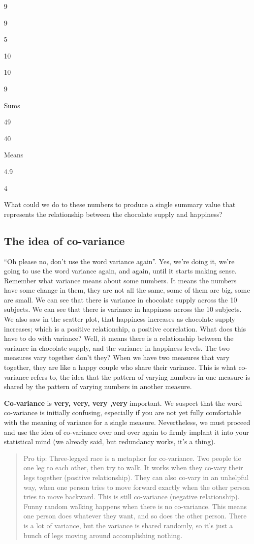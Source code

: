 \documentclass[
]{book}
\begin{document}
9

9

5

10

10

9

Sums

49

40

Means

4.9

4

What could we do to these numbers to produce a single summary value that represents the relationship between the chocolate supply and happiness?

\hypertarget{the-idea-of-co-variance}{%
\subsection{The idea of co-variance}\label{the-idea-of-co-variance}}

``Oh please no, don't use the word variance again''. Yes, we're doing it, we're going to use the word variance again, and again, until it starts making sense. Remember what variance means about some numbers. It means the numbers have some change in them, they are not all the same, some of them are big, some are small. We can see that there is variance in chocolate supply across the 10 subjects. We can see that there is variance in happiness across the 10 subjects. We also saw in the scatter plot, that happiness increases as chocolate supply increases; which is a positive relationship, a positive correlation. What does this have to do with variance? Well, it means there is a relationship between the variance in chocolate supply, and the variance in happiness levels. The two measures vary together don't they? When we have two measures that vary together, they are like a happy couple who share their variance. This is what co-variance refers to, the idea that the pattern of varying numbers in one measure is shared by the pattern of varying numbers in another measure.

\textbf{Co-variance} is \textbf{very, very, very ,very} important. We suspect that the word co-variance is initially confusing, especially if you are not yet fully comfortable with the meaning of variance for a single measure. Nevertheless, we must proceed and use the idea of co-variance over and over again to firmly implant it into your statistical mind (we already said, but redundancy works, it's a thing).

\begin{quote}
Pro tip: Three-legged race is a metaphor for co-variance. Two people tie one leg to each other, then try to walk. It works when they co-vary their legs together (positive relationship). They can also co-vary in an unhelpful way, when one person tries to move forward exactly when the other person tries to move backward. This is still co-variance (negative relationship). Funny random walking happens when there is no co-variance. This means one person does whatever they want, and so does the other person. There is a lot of variance, but the variance is shared randomly, so it's just a bunch of legs moving around accomplishing nothing.
\end{quote}
\end{document}
